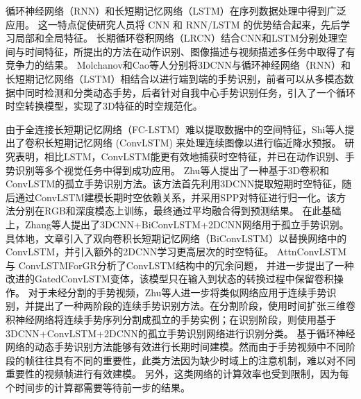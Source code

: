 循环神经网络（RNN）\cite{jozefowicz2015empirical}和长短期记忆网络（LSTM）\cite{yue2015beyond}在序列数据处理中得到广泛应用。
这一特点促使研究人员将 CNN 和 RNN/LSTM 的优势结合起来，先后学习局部和全局特征。
长期循环卷积网络（LRCN）\cite{donahue2015lrcn}结合CNN和LSTM分别处理空间与时间特征，所提出的方法在动作识别、图像描述与视频描述多任务中取得了有竞争力的结果。
Molchanov\cite{molchanov2016online}和Cao\cite{cao2017egocentric}等人分别将3DCNN与循环神经网络（RNN）和长短期记忆网络（LSTM）相结合以进行端到端的手势识别，前者可以从多模态数据中同时检测和分类动态手势，后者针对自我中心手势识别任务，引入了一个循环时空转换模型，实现了3D特征的时空规范化。

由于全连接长短期记忆网络（FC-LSTM）难以提取数据中的空间特征，Shi等人\cite{shi2015convlstm}提出了卷积长短期记忆网络 (ConvLSTM) 来处理连续图像以进行临近降水预报。
研究表明，相比LSTM，ConvLSTM能更有效地捕获时空特征，并已在动作识别、手势识别等多个视觉任务中得到成功应用。
Zhu等人\cite{zhu2017multimodal}提出了一种基于3D卷积和ConvLSTM的孤立手势识别方法。该方法首先利用3DCNN提取短期时空特征，随后通过ConvLSTM建模长期时空依赖关系，并采用SPP\cite{he2015spatial}对特征进行归一化。该方法分别在RGB和深度模态上训练，最终通过平均融合得到预测结果。
在此基础上，Zhang等人\cite{zhang2017learning}提出了3DCNN+BiConvLSTM+2DCNN网络用于孤立手势识别。具体地，文章引入了双向卷积长短期记忆网络（BiConvLSTM）以替换网络中的ConvLSTM，并引入额外的2DCNN学习更高层次的时空特征。
AttnConvLSTM\cite{zhang2018attention}与
ConvLSTMForGR\cite{zhu2019redundancy}分析了ConvLSTM结构中的冗余问题，
并进一步提出了一种改进的GatedConvLSTM变体，该模型只在输入到状态的转换过程中保留卷积操作。
对于未经分割的手势视频，Zhu等人\cite{zhu2018continuous}进一步将类似网络应用于连续手势识别，并提出了一种两阶段的连续手势识别方法。在分割阶段，使用时间扩张三维卷积神经网络将连续手势序列分割成孤立的手势实例；在识别阶段，则使用基于3DCNN+ConvLSTM+2DCNN的孤立手势识别网络进行识别分类。
基于循环神经网络的动态手势识别方法能够有效进行长期时间建模。然而由于手势视频中不同阶段的帧往往具有不同的重要性\cite{lin2018large}，此类方法因为缺少时域上的注意机制，难以对不同重要性的视频帧进行有效建模。
另外，这类网络的计算效率也受到限制，因为每个时间步的计算都需要等待前一步的结果。

